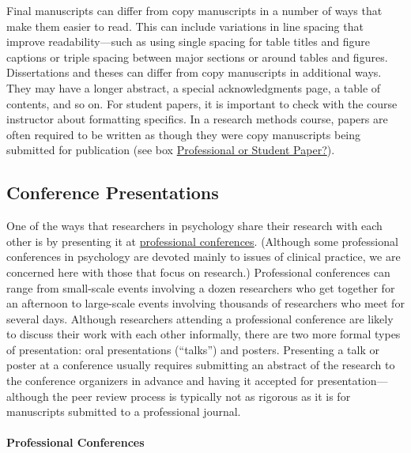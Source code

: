 \documentclass[
]{krantz}
\begin{document}
Final manuscripts can differ from copy manuscripts in a number of ways that make them easier to read. This can include variations in line spacing that improve readability---such as using single spacing for table titles and figure captions or triple spacing between major sections or around tables and figures. Dissertations and theses can differ from copy manuscripts in additional ways. They may have a longer abstract, a special acknowledgments page, a table of contents, and so on. For student papers, it is important to check with the course instructor about formatting specifics. In a research methods course, papers are often required to be written as though they were copy manuscripts being submitted for publication (see box \protect\hyperlink{professional-or-student-paper}{Professional or Student Paper?}).

\hypertarget{conference-presentations}{%
\subsection*{Conference Presentations}\label{conference-presentations}}


One of the ways that researchers in psychology share their research with each other is by presenting it at \protect\hyperlink{professional-conference}{professional conferences}. (Although some professional conferences in psychology are devoted mainly to issues of clinical practice, we are concerned here with those that focus on research.) Professional conferences can range from small-scale events involving a dozen researchers who get together for an afternoon to large-scale events involving thousands of researchers who meet for several days. Although researchers attending a professional conference are likely to discuss their work with each other informally, there are two more formal types of presentation: oral presentations (``talks'') and posters. Presenting a talk or poster at a conference usually requires submitting an abstract of the research to the conference organizers in advance and having it accepted for presentation---although the peer review process is typically not as rigorous as it is for manuscripts submitted to a professional journal.

\hypertarget{professional-conferences}{%
\paragraph*{Professional Conferences}\label{professional-conferences}}
\end{document}
